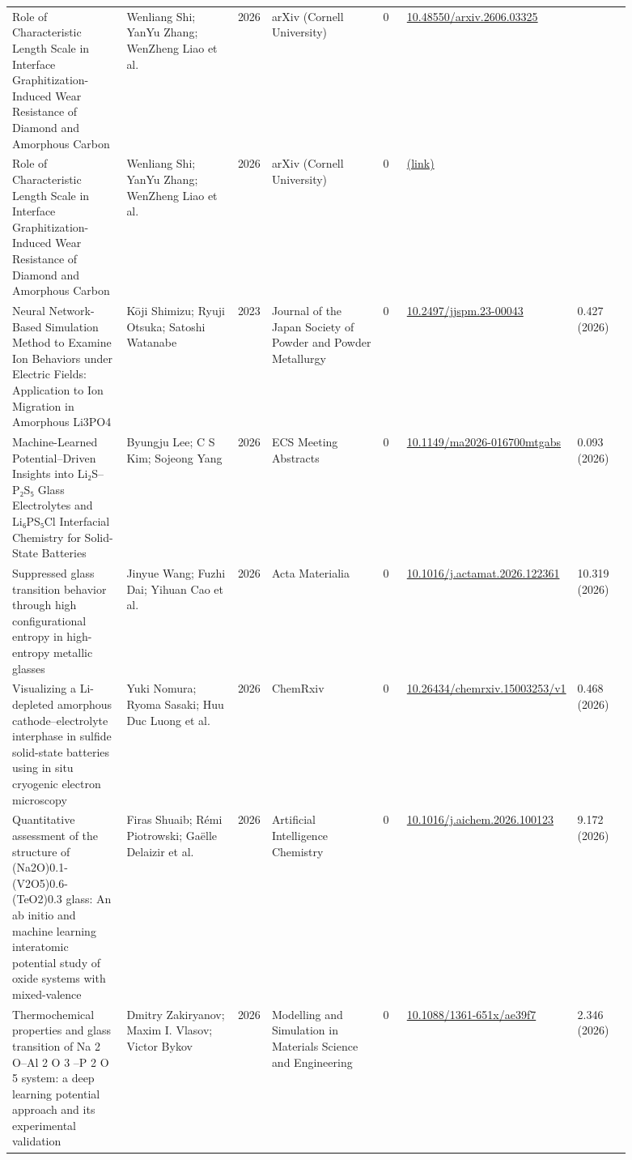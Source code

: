 \documentclass[10pt,a4paper]{article}
\begin{document}
{\begin{longtable}{p{0.192\linewidth}p{0.192\linewidth}p{0.043\linewidth}p{0.192\linewidth}p{0.043\linewidth}p{0.132\linewidth}p{0.096\linewidth}}
Role of Characteristic Length Scale in Interface Graphitization-Induced Wear Resistance of Diamond and Amorphous Carbon & Wenliang Shi; YanYu Zhang; WenZheng Liao et al. & 2026 & arXiv (Cornell University) & 0 & \href{https://doi.org/10.48550/arxiv.2606.03325}{10.48550/arxiv.2606.03325} &  \\
Role of Characteristic Length Scale in Interface Graphitization-Induced Wear Resistance of Diamond and Amorphous Carbon & Wenliang Shi; YanYu Zhang; WenZheng Liao et al. & 2026 & arXiv (Cornell University) & 0 & \href{https://openalex.org/W7163597948}{(link)} &  \\
Neural Network-Based Simulation Method to Examine Ion Behaviors under Electric Fields: Application to Ion Migration in Amorphous Li3PO4 & Kōji Shimizu; Ryuji Otsuka; Satoshi Watanabe & 2023 & Journal of the Japan Society of Powder and Powder Metallurgy & 0 & \href{https://doi.org/10.2497/jjspm.23-00043}{10.2497/jjspm.23-00043} & 0.427 (2026) \\
Machine-Learned Potential–Driven Insights into Li₂S–P₂S₅ Glass Electrolytes and Li₆PS₅Cl Interfacial Chemistry for Solid-State Batteries & Byungju Lee; C S Kim; Sojeong Yang & 2026 & ECS Meeting Abstracts & 0 & \href{https://doi.org/10.1149/ma2026-016700mtgabs}{10.1149/ma2026-016700mtgabs} & 0.093 (2026) \\
Suppressed glass transition behavior through high configurational entropy in high-entropy metallic glasses & Jinyue Wang; Fuzhi Dai; Yihuan Cao et al. & 2026 & Acta Materialia & 0 & \href{https://doi.org/10.1016/j.actamat.2026.122361}{10.1016/j.actamat.2026.122361} & 10.319 (2026) \\
Visualizing a Li-depleted amorphous cathode–electrolyte interphase in sulfide solid-state batteries using in situ cryogenic electron microscopy & Yuki Nomura; Ryoma Sasaki; Huu Duc Luong et al. & 2026 & ChemRxiv & 0 & \href{https://doi.org/10.26434/chemrxiv.15003253/v1}{10.26434/chemrxiv.15003253/v1} & 0.468 (2026) \\
Quantitative assessment of the structure of (Na2O)0.1-(V2O5)0.6-(TeO2)0.3 glass: An ab initio and machine learning interatomic potential study of oxide systems with mixed-valence & Firas Shuaib; Rémi Piotrowski; Gaëlle Delaizir et al. & 2026 & Artificial Intelligence Chemistry & 0 & \href{https://doi.org/10.1016/j.aichem.2026.100123}{10.1016/j.aichem.2026.100123} & 9.172 (2026) \\
Thermochemical properties and glass transition of Na 2 O–Al 2 O 3 –P 2 O 5 system: a deep learning potential approach and its experimental validation & Dmitry Zakiryanov; Maxim I. Vlasov; Victor Bykov & 2026 & Modelling and Simulation in Materials Science and Engineering & 0 & \href{https://doi.org/10.1088/1361-651x/ae39f7}{10.1088/1361-651x/ae39f7} & 2.346 (2026) \\

\end{longtable}}
\end{document}
